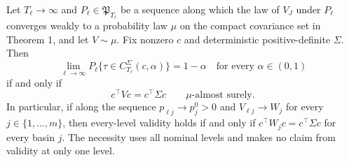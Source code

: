 Let \(T_\ell\to\infty\) and \(P_\ell\in\mathfrak P_{T_\ell}\) be a sequence along which the law of \(V_J\) under \(P_\ell\) converges weakly to a probability law \(\mu\) on the compact covariance set in Theorem 1, and let \(V\sim\mu\). Fix nonzero \(c\) and deterministic positive-definite \(\Sigma\). Then
\[
 \lim_{\ell\to\infty}P_\ell\{\tau\in C_{T_\ell}^{\Sigma}(c,\alpha)\}=1-\alpha
 \quad\text{for every }\alpha\in(0,1)
\]
if and only if
\[
 c^\top Vc=c^\top\Sigma c\qquad\mu\text{-almost surely}.
\]
In particular, if along the sequence \(p_{\ell j}\to p_j^0>0\) and \(V_{\ell j}\to W_j\) for every \(j\in\{1,\ldots,m\}\), then every-level validity holds if and only if \(c^\top W_jc=c^\top\Sigma c\) for every basin \(j\). The necessity uses all nominal levels and makes no claim from validity at only one level.